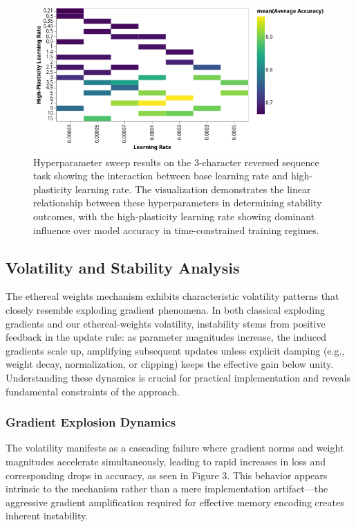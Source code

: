 \documentclass{article} %
\begin{document}
\begin{figure}[h]
\begin{center}
\includegraphics[width=0.8\linewidth]{figure_5.png}
\caption{Hyperparameter sweep results on the 3-character reversed sequence task showing the interaction between base learning rate and high-plasticity learning rate. The visualization demonstrates the linear relationship between these hyperparameters in determining stability outcomes, with the high-plasticity learning rate showing dominant influence over model accuracy in time-constrained training regimes.}
\label{fig:hyperparameter_sweep}
\end{center}
\end{figure}


\subsection{Volatility and Stability Analysis}

The ethereal weights mechanism exhibits characteristic volatility patterns that closely resemble exploding gradient phenomena. In both classical exploding gradients and our ethereal-weights volatility, instability stems from positive feedback in the update rule: as parameter magnitudes increase, the induced gradients scale up, amplifying subsequent updates unless explicit damping (e.g., weight decay, normalization, or clipping) keeps the effective gain below unity. Understanding these dynamics is crucial for practical implementation and reveals fundamental constraints of the approach.

\subsubsection{Gradient Explosion Dynamics}

The volatility manifests as a cascading failure where gradient norms and weight magnitudes accelerate simultaneously, leading to rapid increases in loss and corresponding drops in accuracy, as seen in Figure 3. This behavior appears intrinsic to the mechanism rather than a mere implementation artifact—the aggressive gradient amplification required for effective memory encoding creates inherent instability.
\end{document}
